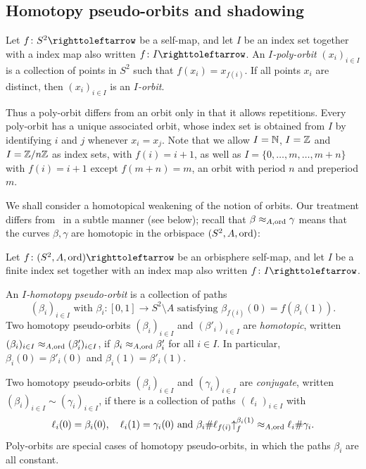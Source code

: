 \documentclass{amsart}
\begin{document}
\subsection{Homotopy pseudo-orbits and shadowing}\label{ss:shadowing}
Let $f\colon S^2\selfmap$ be a self-map, and let $I$ be an index set
together with a index map also written $f\colon I\selfmap$.  An
\emph{$I$-poly-orbit} $(x_i)_{i\in I}$ is a collection of points in
$S^2$ such that $f(x_i)=x_{f(i)}$. If all points $x_i$ are distinct,
then $(x_i)_{i\in I}$ is an \emph{$I$-orbit}.

Thus a poly-orbit differs from an orbit only in that it allows
repetitions. Every poly-orbit has a unique associated orbit, whose
index set is obtained from $I$ by identifying $i$ and $j$ whenever
$x_i=x_j$. Note that we allow $I={\mathbb N}$, $I={\mathbb Z}$ and $I={\mathbb Z}/n{\mathbb Z}$ as index
sets, with $f(i)=i+1$, as well as $I=\{0,\dots,m,\dots,m+n\}$ with
$f(i)=i+1$ except $f(m+n)=m$, an orbit with period $n$ and preperiod
$m$.

We shall consider a homotopical weakening of the notion of orbits. Our
treatment differs from~\cite{ishii-smillie:shadowing} in a subtle manner
(see below); recall that $\beta\approx_{A,\operatorname{ord}}\gamma$ means that the
curves $\beta,\gamma$ are homotopic in the orbispace $(S^2,A,\operatorname{ord})$:
\begin{defn}
\label{defn:HomPsOrbit}
  Let $f\colon (S^2,A,\ord)\selfmap$ be an orbisphere self-map, and
  let $I$ be a finite index set together with an index map also written
  $f\colon I\selfmap$.

  An \emph{$I$-homotopy pseudo-orbit} is a collection of paths
  \[(\beta_i)_{i\in I} \text{ with } \beta_i\colon[0,1]\to S^2\setminus A \text{ satisfying }\beta_{f(i)}(0)=f(\beta_i(1)).
  \]
  Two homotopy pseudo-orbits $(\beta_i)_{i\in I}$ and
  $(\beta'_i)_{i\in I}$ are \emph{homotopic}, written
  $(\beta_i)_{i\in I}\approx_{A,\operatorname{ord}}(\beta'_i)_{i\in I}$, if
  $\beta_i\approx_{A,\operatorname{ord}}\beta'_i$ for all $i\in I$. In particular,
  $\beta_i(0)=\beta'_i(0)$ and $\beta_i(1)=\beta'_i(1)$.

  Two homotopy pseudo-orbits $(\beta_i)_{i\in I}$ and
  $(\gamma_i)_{i\in I}$ are \emph{conjugate}, written
  $(\beta_i)_{i\in I}\sim(\gamma_i)_{i\in I}$, if there is a
  collection of paths $(\ell_i)_{i\in I}$ with
  \[\ell_i(0)=\beta_i(0),\quad \ell_i(1)=\gamma_i(0)\text{ and
    }\beta_i\#\ell_{f(i)}{\uparrow}_{f}^{\beta_i(1)}\approx_{A,\operatorname{ord}}\ell_i\#\gamma_i.
  \]
  Poly-orbits are special cases of homotopy pseudo-orbits, in which
  the paths $\beta_i$ are all constant.
\end{defn}
\end{document}
